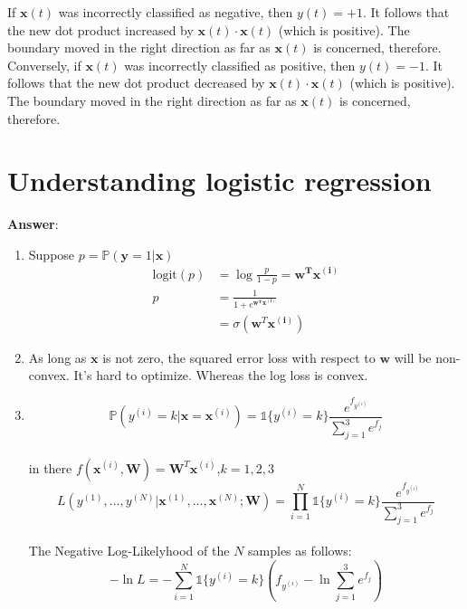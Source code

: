 \documentclass{article}
\begin{document}
\begin{enumerate}[(1)]
If $\bm{x}(t)$ was incorrectly classified as negative, then $y(t) = +1$. It follows that the new dot product increased by $\bm{x}(t)\cdot \bm{x}(t)$ (which is positive). The boundary moved in the right direction as far as $\bm{x}(t)$ is concerned, therefore.\\
Conversely, if $\bm{x}(t)$ was incorrectly classified as positive, then $y(t) = -1$. It follows that the new dot product decreased by $\bm{x}(t)\cdot \bm{x}(t)$ (which is positive). The boundary moved in the right direction as far as $\bm{x}(t)$ is concerned, therefore.
\end{enumerate}



\section{Understanding logistic regression}


\textbf{Answer}: 
\begin{enumerate}[(1)]
	\item Suppose $p = \mathbb{P}(\bm{y}=1|\bm{x})$\\
	\begin{equation}
	\begin{aligned}
	 \text{logit}(p) &= \log \frac{p}{1-p} = \bm{w^T}\bm{x^{(i)}}\\
	 p &= \frac{1}{1+e^{\bm{w^T}\bm{x^{(i)}}}}\\
	 &=\sigma(\bm{w}^T\bm{x^{(i)}})
	\end{aligned}
	\end{equation}
	\item As long as $\bm{x}$ is not zero, the squared error loss with respect to $\bm{w}$ will be non-convex. It's hard to optimize. Whereas the log loss is convex.

	\item $$\mathbb{P}(y^{(i)}=k|\bm{x}=\bm{x}^{(i)}) = \mathds{1}\{y^{(i)}=k\}\frac{e^{f_{y^{(i)}}}}{\sum_{j=1}^{3}e^{f_j}}$$\\
	in there $f(\bm{x}^{(i)}, \bm{W})=\bm{W}^T\bm{x}^{(i)}$,$k=1,2,3$\\
	$$L(y^{(1)},\dots,y^{(N)}|\bm{x}^{(1)},\dots, \bm{x}^{(N)};\bm{W}) = \prod_{i=1}^{N}\mathds{1}\{y^{(i)}=k\}\frac{e^{f_{y^{(i)}}}}{\sum_{j=1}^{3}e^{f_j}}$$\\
	The Negative Log-Likelyhood of the $N$ samples as follows:\\
	$$-\ln{L} = -\sum_{i=1}^{N}\mathds{1}\{y^{(i)}=k\}(f_{y^{(i)}}-\ln{\sum_{j=1}^{3}e^{f_j}})$$
\end{enumerate}
\end{document}

